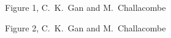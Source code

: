 \commentoutA{\documentclass[prb,aps,twocolumn,twocolumngrid]{revtex4}}
\begin{document}
{\pagebreak

\pagebreak

\begin{center}
Figure 1, C.~K.~Gan and M.~Challacombe \\[1.cm]
\end{center}

\pagebreak
\begin{center}
Figure 2, C.~K.~Gan and M.~Challacombe \\[1.cm]
\end{center}

}
\end{document}
